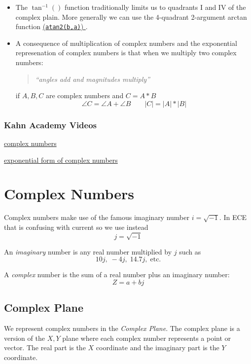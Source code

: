 \begin{itemize}
  \item The $\tan^{-1}()$ function traditionally limits us to quadrants I and IV of the complex plain.    More generally we can use the 4-quadrant 2-argument arctan function \href{http://en.wikipedia.org/wiki/Atan2}{({\tt atan2(b,a)}) }.

  \item A consequence of multiplication of complex numbers and the exponential represenation of complex numbers is that when we multiply two complex numbers:
     \begin{quotation} {\it ``angles add and magnitudes multiply''}
     \end{quotation}
   if $A,B,C$ are complex numbers and $C = A * B$
   \[
    \angle{C} = \angle{A}+\angle{B}  \qquad   |C| = |A|*|B|
   \]


\end{itemize}

\subsubsection{Kahn Academy Videos}\label{KahnV}

\href{https://www.khanacademy.org/math/algebra/complex-numbers/complex_numbers/v/complex-numbers}{complex numbers}

\href{https://www.khanacademy.org/math/trigonometry/imaginary_complex_precalc/complex_analysis/v/exponential-form-to-find-complex-roots}{exponential form of complex numbers}




\newpage
\section{Complex Numbers}


Complex numbers make use of the famous imaginary number
$i = \sqrt{-1}$.    In ECE that is confusing with current so we use instead
\[
  j = \sqrt{-1}
\]

An {\it imaginary} number is any real number multiplied by $j$ such as
\[
10j,\; -4j,\; 14.7j, \; \mathrm{etc.}
\]

A {\it complex} number is the sum of a real number plus an imaginary number:
\[
  Z = a + bj
\]

\subsection{Complex Plane}

We represent complex numbers in the {\it Complex Plane}.   The complex plane is
a version of the $X,Y$ plane where each complex number represents a point or vector.
The real part is the $X$ coordinate and the imaginary part is the $Y$ coordinate.

